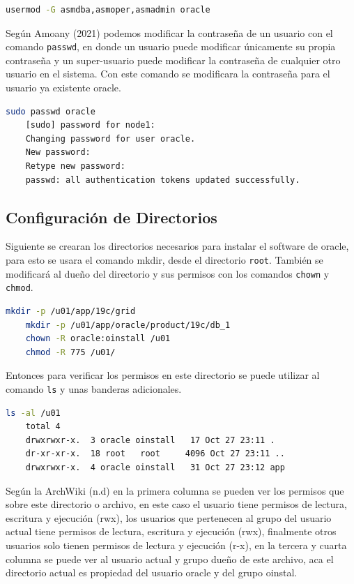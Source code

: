 \documentclass{article}
\begin{document}
\begin{lstlisting}[style=mystyle,language=bash]
	usermod -G asmdba,asmoper,asmadmin oracle
\end{lstlisting}

Según Amoany (2021) podemos modificar la contraseña de un usuario con el comando \texttt{passwd}, en donde un usuario puede modificar únicamente su propia contraseña y un super-usuario puede modificar la contraseña de cualquier otro usuario en el sistema. Con este comando se modificara la contraseña para el usuario ya existente oracle.

\begin{lstlisting}[style=mystyle,language=bash]
	sudo passwd oracle
	[sudo] password for node1:
	Changing password for user oracle.
	New password:
	Retype new password:
	passwd: all authentication tokens updated successfully.
\end{lstlisting}

\subsection{Configuración de Directorios}

Siguiente se crearan los directorios necesarios para instalar el software de oracle, para esto se usara el comando mkdir, desde el directorio \texttt{root}. También se modificará al dueño del directorio y sus permisos con los comandos \texttt{chown} y \texttt{chmod}.

\begin{lstlisting}[style=mystyle,language=bash]
	mkdir -p /u01/app/19c/grid
	mkdir -p /u01/app/oracle/product/19c/db_1
	chown -R oracle:oinstall /u01
	chmod -R 775 /u01/
\end{lstlisting}

Entonces para verificar los permisos en este directorio se puede utilizar al comando \texttt{ls} y unas banderas adicionales.

\begin{lstlisting}[style=mystyle,language=bash]
	ls -al /u01
	total 4
	drwxrwxr-x.  3 oracle oinstall   17 Oct 27 23:11 .
	dr-xr-xr-x.  18 root   root 	4096 Oct 27 23:11 ..
	drwxrwxr-x.  4 oracle oinstall   31 Oct 27 23:12 app
\end{lstlisting}

Según la ArchWiki (n.d) en la primera columna se pueden ver los permisos que sobre este directorio o archivo, en este caso el usuario tiene permisos de lectura, escritura y ejecución (rwx), los usuarios que pertenecen al grupo del usuario actual tiene permisos de lectura, escritura y ejecución (rwx), finalmente otros usuarios solo tienen permisos de lectura y ejecución (r-x), en la tercera y cuarta columna se puede ver al usuario actual y grupo dueño de este archivo, aca el directorio actual es propiedad del usuario oracle y del grupo oinstal.
\end{document}
